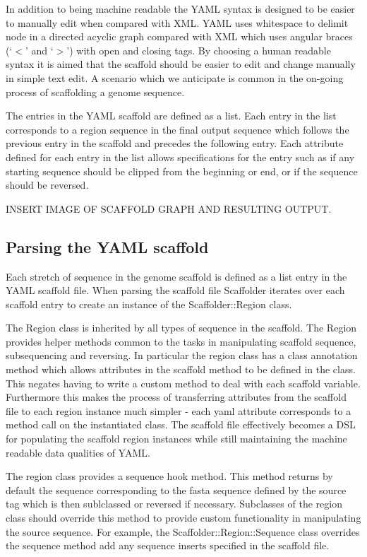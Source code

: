 \documentclass[10pt]{bmc_article}
\newenvironment{bmcformat}{\begin{raggedright}\baselineskip20pt\sloppy\setboolean{publ}{false}}{\end{raggedright}\baselineskip20pt\sloppy}
\begin{document}
\begin{bmcformat}
In addition to being machine readable the YAML syntax is designed to be easier
to manually edit when compared with XML. YAML uses whitespace to delimit node
in a directed acyclic graph compared with XML which uses angular braces (`$<$'
and `$>$') with open and closing tags. By choosing a human readable syntax it is
aimed that the scaffold should be easier to edit and change manually in simple
text edit. A scenario which we anticipate is common in the on-going process of
scaffolding a genome sequence. \pb

The entries in the YAML scaffold are defined as a list. Each entry in the list
corresponds to a region sequence in the final output sequence which follows
the previous entry in the scaffold and precedes the following entry. Each
attribute defined for each entry in the list allows specifications for the
entry such as if any starting sequence should be clipped from the beginning or
end, or if the sequence should be reversed. \pb

INSERT IMAGE OF SCAFFOLD GRAPH AND RESULTING OUTPUT.

\subsection*{Parsing the YAML scaffold} %

Each stretch of sequence in the genome scaffold is defined as a list entry in
the YAML scaffold file. When parsing the scaffold file Scaffolder iterates over
each scaffold entry to create an instance of the Scaffolder::Region class.\pb

The Region class is inherited by all types of sequence in the scaffold. The
Region provides helper methods common to the tasks in manipulating scaffold
sequence, subsequencing and reversing. In particular the region class has
a class annotation method\cite{class-annotations} which allows attributes in
the scaffold method to be defined in the class. This negates having to write
a custom method to deal with each scaffold variable.  Furthermore this makes
the process of transferring attributes from the scaffold file to each region
instance much simpler - each yaml attribute corresponds to a method call on the
instantiated class. The scaffold file effectively becomes a DSL for populating
the scaffold region instances while still maintaining the machine readable data
qualities of YAML.\pb

The region class provides a sequence hook method. This method returns by
default the sequence corresponding to the fasta sequence defined by the source
tag which is then sublclassed or reversed if necessary. Subclasses of the
region class should override this method to provide custom functionality in
manipulating the source sequence. For example, the Scaffolder::Region::Sequence
class overrides the sequence method add any sequence inserts specified in the
scaffold file.\pb


\end{bmcformat}
\end{document}
